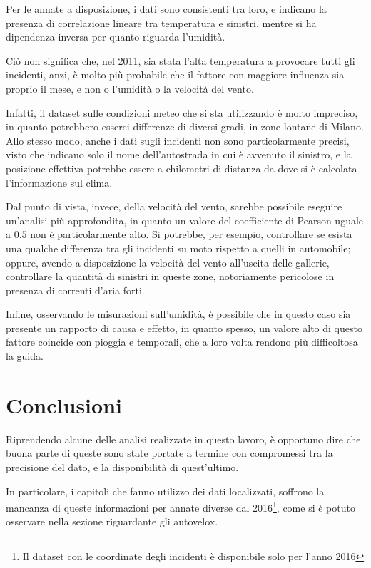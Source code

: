 \documentclass[a4paper,12pt]{report}
\begin{document}
Per le annate a disposizione, i dati sono consistenti tra loro, e indicano la presenza di 
correlazione lineare tra temperatura e sinistri, mentre si ha dipendenza inversa per quanto 
riguarda l'umidità. 

Ciò non significa che, nel 2011, sia stata l'alta temperatura a provocare 
tutti gli incidenti, anzi, è molto più probabile che il fattore con maggiore 
influenza sia proprio il mese, e non o l'umidità o la velocità del vento. 

Infatti, il dataset sulle condizioni meteo che si sta utilizzando è molto impreciso, 
in quanto potrebbero esserci differenze di diversi gradi, in zone lontane di Milano. 
Allo stesso modo, anche i dati sugli incidenti non sono particolarmente precisi, 
visto che indicano solo il nome dell'autostrada in cui è avvenuto 
il sinistro, e la posizione effettiva potrebbe essere a chilometri di distanza da dove 
si è calcolata l'informazione sul clima. 

Dal punto di vista, invece, della velocità del vento, sarebbe possibile eseguire 
un'analisi più approfondita, in quanto un valore del coefficiente di Pearson uguale 
a $0.5$ non è particolarmente alto. 
Si potrebbe, per esempio, controllare se esista una qualche differenza tra gli 
incidenti su moto rispetto a quelli in automobile; 
oppure, avendo a disposizione la velocità del vento all'uscita delle gallerie, 
controllare la quantità di sinistri in queste zone, notoriamente pericolose 
in presenza di correnti d'aria forti. 

Infine, osservando le misurazioni sull'umidità, è possibile che in questo caso sia presente 
un rapporto di causa e effetto, in quanto spesso, un valore alto di questo fattore 
coincide con pioggia e temporali, che a loro volta rendono più difficoltosa la guida. 

\chapter{Conclusioni}

Riprendendo alcune delle analisi realizzate in questo lavoro, è opportuno dire che buona 
parte di queste sono state portate a termine con compromessi tra la precisione del dato, e 
la disponibilità di quest'ultimo. 

In particolare, i capitoli che fanno utilizzo dei dati localizzati, soffrono la mancanza di 
queste informazioni per annate diverse dal 
2016\footnote{Il dataset con le coordinate degli incidenti è disponibile solo per l'anno 2016}, 
come si è potuto osservare nella sezione riguardante gli autovelox. 
\end{document}
